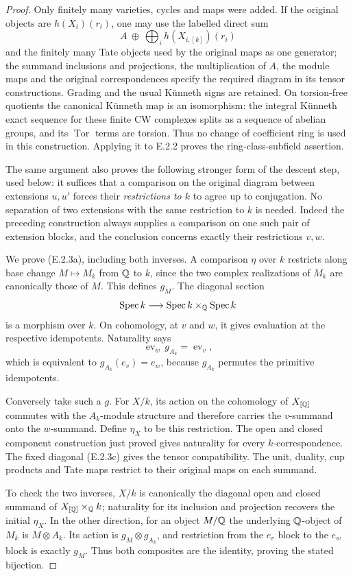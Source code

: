 \begin{proof}
Only finitely many varieties, cycles and maps were added. If the original objects are $h(X_i)(r_i)$, one may use the labelled direct sum
\[
 A\ \oplus\ \bigoplus_i h(X_{i,[k]})(r_i)
\]
and the finitely many Tate objects used by the original maps as one generator; the summand inclusions and projections, the multiplication of $A$, the module maps and the original correspondences specify the required diagram in its tensor constructions. Grading and the usual K\"unneth signs are retained. On torsion-free quotients the canonical K\"unneth map is an isomorphism: the integral K\"unneth exact sequence for these finite CW complexes splits as a sequence of abelian groups, and its $\operatorname{Tor}$ terms are torsion. Thus no change of coefficient ring is used in this construction. Applying it to E.2.2 proves the ring-class-subfield assertion.

The same argument also proves the following stronger form of the descent step, used below: it suffices that a comparison on the original diagram between extensions $u,u'$ forces their \emph{restrictions to $k$} to agree up to conjugation. No separation of two extensions with the same restriction to $k$ is needed. Indeed the preceding construction always supplies a comparison on one such pair of extension blocks, and the conclusion concerns exactly their restrictions $v,w$.

We prove (E.2.3a), including both inverses. A comparison $\eta$ over $k$ restricts along base change $M\mapsto M_k$ from $\mathbb Q$ to $k$, since the two complex realizations of $M_k$ are canonically those of $M$. This defines $g_M$. The diagonal section
\[
 \operatorname{Spec}k\longrightarrow
              \operatorname{Spec}k\times_{\mathbb Q}\operatorname{Spec}k
\]
is a morphism over $k$. On cohomology, at $v$ and $w$, it gives evaluation at the respective idempotents. Naturality says
\[
 \operatorname{ev}_w\,g_{A_k}=\operatorname{ev}_v,
\]
which is equivalent to $g_{A_k}(e_v)=e_w$, because $g_{A_k}$ permutes the primitive idempotents.

Conversely take such a $g$. For $X/k$, its action on the cohomology of $X_{[\mathbb Q]}$ commutes with the $A_k$-module structure and therefore carries the $v$-summand onto the $w$-summand. Define $\eta_X$ to be this restriction. The open and closed component construction just proved gives naturality for every $k$-correspondence. The fixed diagonal (E.2.3c) gives the tensor compatibility. The unit, duality, cup products and Tate maps restrict to their original maps on each summand.

To check the two inverses, $X/k$ is canonically the diagonal open and closed summand of $X_{[\mathbb Q]}\times_{\mathbb Q}k$; naturality for its inclusion and projection recovers the initial $\eta_X$. In the other direction, for an object $M/\mathbb Q$ the underlying $\mathbb Q$-object of $M_k$ is $M\otimes A_k$. Its action is $g_M\otimes g_{A_k}$, and restriction from the $e_v$ block to the $e_w$ block is exactly $g_M$. Thus both composites are the identity, proving the stated bijection.
\end{proof}

